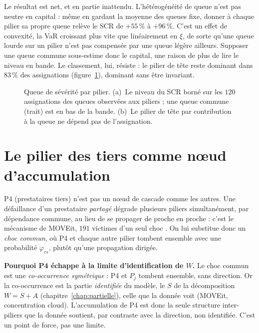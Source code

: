 Le résultat est net, et en partie inattendu. L'hétérogénéité de queue n'est pas
neutre en capital : même en gardant la moyenne des queues fixe, donner à chaque pilier sa
propre queue relève le SCR de $+55\,\%$ à $+96\,\%$. C'est un effet de convexité, la
VaR croissant plus vite que linéairement en $\xi$, de sorte qu'une queue lourde sur un pilier
n'est pas compensée par une queue légère ailleurs. Supposer une queue commune
sous-estime donc le capital, une raison de plus de lire le niveau en bande. Le classement,
lui, résiste : le pilier de tête reste dominant dans $83\,\%$ des assignations
(figure~\ref{fig:xi-pilier}), dominant sans être invariant.

\begin{figure}[htbp]\centering
{}
\caption{Queue de sévérité par pilier. (a)~Le niveau du SCR borné sur les $120$ assignations
des queues observées aux piliers ; une queue commune (trait) est en bas de la bande.
(b)~Le pilier de tête par contribution à la queue ne dépend pas de l'assignation.}
\label{fig:xi-pilier}
\end{figure}

\section{Le pilier des tiers comme n\oe{}ud d'accumulation}
\label{sec:p4-accumulation}

P4 (prestataires tiers) n'est pas un n\oe{}ud de cascade comme les autres. Une défaillance
d'un prestataire \emph{partagé} dégrade plusieurs piliers simultanément, par
dépendance commune, au lieu de se propager de proche en proche : c'est le mécanisme de MOVEit,
$191$ victimes d'un seul choc \matcomp. On lui
substitue donc un
\emph{choc commun}, où P4 et chaque autre pilier tombent ensemble avec une probabilité
$\varphi_{cs}$, plutôt qu'une propagation dirigée.

\begin{cle}
\textbf{Pourquoi P4 échappe à la limite d'identification de $W$.} Le choc commun est une
\emph{co-occurrence symétrique} : P4 et $P_j$ tombent ensemble, sans direction. Or la
co-occurrence est la partie \emph{identifiée} du modèle, le $S$ de la décomposition
$W=S+A$ (chapitre~\ref{chap:partielle}), celle que la donnée voit (MOVEit, concentration
cloud). L'accumulation de P4 est donc la seule structure inter-piliers que la donnée
soutient, par contraste avec la direction, non identifiée. C'est un point de force, pas une
limite.
\end{cle}


